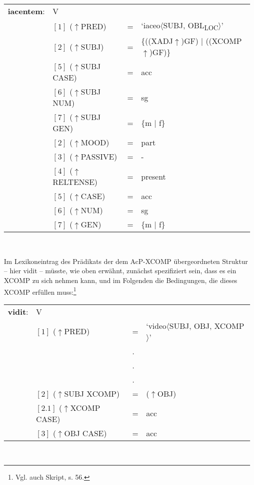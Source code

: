 \documentclass[12pt,a4paper]{article}
\begin{document}
\begin{singlespace}
\begin{tabular}{ l  l  l  l  } 
\textbf{iacentem}: & V \\ 
$\qquad$ & $[1]$ \: ($\uparrow$PRED) & = & `iaceo$\langle$SUBJ, OBL\textsubscript{LOC}$\rangle$'\\
$\qquad$ & $[2]$ \:  ($\uparrow$SUBJ) & = & \{((XADJ$\uparrow$)GF) $\mid$ ((XCOMP$\uparrow$)GF)\} \\
$\qquad$ & $[5]$ \: ($\uparrow$SUBJ CASE) & = & acc \\
$\qquad$ & $[6]$ \: ($\uparrow$SUBJ NUM) & = & sg \\
$\qquad$ & $[7]$ \: ($\uparrow$SUBJ GEN) & = & \{m $\mid$ f\} \\
$\qquad$ & $[2]$ \: ($\uparrow$MOOD) & = & part\\
$\qquad$ & $[3]$ \: ($\uparrow$PASSIVE) & = & - \\
$\qquad$ & $[4]$ \: ($\uparrow$RELTENSE) & = & present \\
$\qquad$ & $[5]$ \: ($\uparrow$CASE) & = & acc \\
$\qquad$ & $[6]$ \: ($\uparrow$NUM) & = & sg \\
$\qquad$ & $[7]$ \: ($\uparrow$GEN) & = & \{m $\mid$ f\} \\

\end{tabular}\\
\newline
\end{singlespace}
Im Lexikoneintrag des Prädikats der dem AcP-XCOMP übergeordneten Struktur -- hier vidit -- müsste, wie oben erwähnt, zunächst spezifiziert sein, dass es ein XCOMP zu sich nehmen kann, und im Folgenden die Bedingungen, die dieses XCOMP erfüllen muss:\footnote{Vgl. auch Skript, s. 56.} \\
\begin{singlespace}
\begin{tabular}{ l  l  l  l  } 
\textbf{vidit}: & V \\
$\qquad$ & $[1]$ \: ($\uparrow$PRED) & = & `video$\langle$SUBJ, OBJ, XCOMP$\rangle$'\\
$\qquad$ & $\qquad$ & . \\
$\qquad$ & $\qquad$ & . \\
$\qquad$ & $\qquad$ & . \\
$\qquad$ & $[2]$ \:  ($\uparrow$SUBJ XCOMP) & = & ($\uparrow$OBJ)\\
$\qquad$ & $[2.1]$ \: ($\uparrow$XCOMP CASE) & = & acc \\
$\qquad$ & $[3]$ \: ($\uparrow$OBJ CASE) & = & acc \\
\end{tabular}\\
\newline
\end{singlespace}
\end{document}
